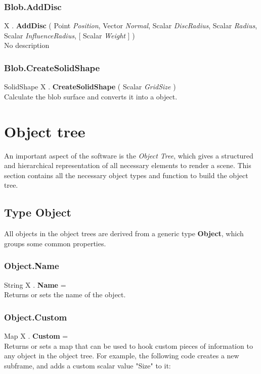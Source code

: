 \subsubsection{Blob.AddDisc \label{F:Blob:AddDisc}}
X . \textbf{AddDisc} ( Point \textit{Position}, Vector \textit{Normal}, Scalar \textit{DiscRadius}, Scalar \textit{Radius}, Scalar \textit{InfluenceRadius},  [ Scalar \textit{Weight} ] ) \\
No description

\subsubsection{Blob.CreateSolidShape \label{F:Blob:CreateSolidShape}}
SolidShape X . \textbf{CreateSolidShape} ( Scalar \textit{GridSize} ) \\
Calculate the blob surface and converts it into a  object.

\section{Object tree \label{Object tree}}
An important aspect of the software is the \textit{Object Tree}, which gives a structured and hierarchical representation of all necessary elements to render a scene. This section contains all the necessary object types and function to build the object tree.

\subsection{Type Object \label{T:Object}}
All objects in the object trees are derived from a generic type \textbf{Object}, which groups some common properties.

\subsubsection{Object.Name \label{F:Object:Name}}
String X . \textbf{Name} = \\
Returns or sets the name of the object.

\subsubsection{Object.Custom \label{F:Object:Custom}}
Map X . \textbf{Custom} = \\
Returns or sets a map that can be used to hook custom pieces of information to any object in the object tree. For example, the following code creates a new subframe, and adds a custom scalar value "Size" to it: \\

